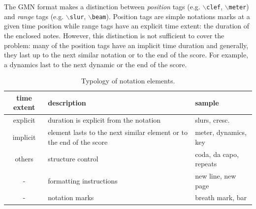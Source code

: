 \documentclass[twoside,10pt,a4paper]{article}
\newcommand{\code}[1]	{{\small \texttt{#1}}}
\newcommand{\gtag}[1]	{$\backslash$\code{#1}}
\begin{document}
The GMN format makes a distinction between \emph{position} tags (e.g. \gtag{clef}, \gtag{meter}) and \emph{range} tags (e.g. \gtag{slur}, \gtag{beam}). Position tags are simple notations marks at a given time position while range tags have an explicit time extent: the duration of the enclosed notes. 
However, this distinction is not sufficient to cover the problem: many of the position tags have an implicit time duration and generally, they last up to the next similar notation or to the end of the score. For example, a dynamics last to the next dynamic or the end of the score.
%
\begin{table}[htdp]
\begin{center}
\begin{tabular}{cll}
time extent & description & sample \\
\hline
explicit 	& duration is explicit from the notation	& slurs, cresc. \\
implicit 	& element lasts to the next similar element or to the end of the score		& meter, dynamics, key \\
others 		& structure control			& coda, da capo, repeats\\
	- 		& formatting instructions		& new line, new page \\
	- 		& notation marks	& breath mark, bar \\
\hline
\end{tabular}
\end{center}
\caption{Typology of notation elements.}
\label{types}
\end{table}
\end{document}

